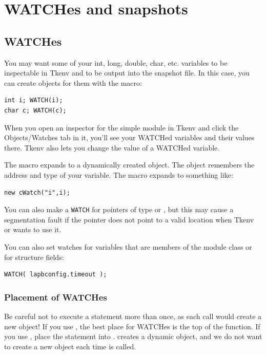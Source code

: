 \section{WATCHes and snapshots}

\subsection{WATCHes}

You may want some of your int, long, double, char, etc. variables to
be inspectable in Tkenv and to be output into the snapshot
file. In this case, you can create
 objects for them with the  macro:

\begin{verbatim}
int i; WATCH(i);
char c; WATCH(c);
\end{verbatim}

When you open an inspector for the simple module in Tkenv and click
the Objects/Watches tab in it, you'll see your WATCHed variables
and their values there. Tkenv also lets you change the value of a
WATCHed variable.

The  macro expands to a dynamically created 
object.  The object remembers the address and type of your variable.
The macro expands to something like:

\begin{verbatim}
new cWatch("i",i);
\end{verbatim}


You can also make a \texttt{WATCH} for pointers of type  or
, but this may cause a segmentation fault if
the pointer does not point to a valid location when Tkenv or
 wants to use it.

You can also set watches for variables that are members of the
module class or for structure fields:

\begin{verbatim}
WATCH( lapbconfig.timeout );
\end{verbatim}


\subsubsection{Placement of WATCHes}


Be careful not to execute a  statement more than once,
as each call would create a new  object! If you use
, the best place for WATCHes is the top of the
 function.  If you use ,
place the  statement into .
 creates a dynamic  object, and we do
not want to create a new object each time  is
called.




